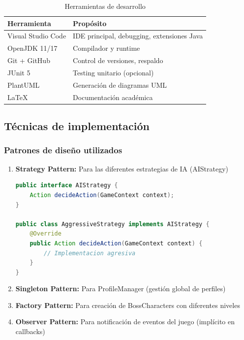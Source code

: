 \documentclass[12pt,a4paper]{article}
\begin{document}
\begin{table}[H]
\centering
\caption{Herramientas de desarrollo}
\begin{tabular}{|p{4cm}|p{8cm}|}
\hline
\textbf{Herramienta} & \textbf{Propósito} \\
\hline
Visual Studio Code & IDE principal, debugging, extensiones Java \\
\hline
OpenJDK 11/17 & Compilador y runtime \\
\hline
Git + GitHub & Control de versiones, respaldo \\
\hline
JUnit 5 & Testing unitario (opcional) \\
\hline
PlantUML & Generación de diagramas UML \\
\hline
LaTeX & Documentación académica \\
\hline
\end{tabular}
\label{tab:herramientas}
\end{table}

\subsection{Técnicas de implementación}

\subsubsection{Patrones de diseño utilizados}

\begin{enumerate}
    \item \textbf{Strategy Pattern:} Para las diferentes estrategias de IA (AIStrategy)
    \begin{lstlisting}[language=Java, caption=Strategy Pattern]
public interface AIStrategy {
    Action decideAction(GameContext context);
}

public class AggressiveStrategy implements AIStrategy {
    @Override
    public Action decideAction(GameContext context) {
        // Implementacion agresiva
    }
}
    \end{lstlisting}
    
    \item \textbf{Singleton Pattern:} Para ProfileManager (gestión global de perfiles)
    
    \item \textbf{Factory Pattern:} Para creación de BossCharacters con diferentes niveles
    
    \item \textbf{Observer Pattern:} Para notificación de eventos del juego (implícito en callbacks)
\end{enumerate}
\end{document}
